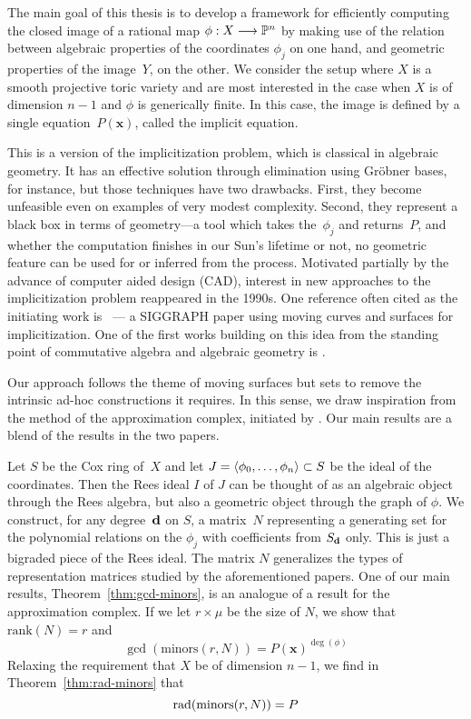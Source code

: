 \documentclass[fleqn,reqno]{amsart}
\begin{document}

The main goal of this thesis is to develop a framework for
efficiently computing the closed image of a rational map $\phi:X\longrightarrow\mathbb{P}^n$ by
making use of the relation between algebraic properties of the coordinates $\phi_j$ on one hand,
and geometric properties of the image~$Y$, on the other.
We consider the setup where $X$ is a smooth projective toric variety
and are most interested in the case when $X$ is of dimension $n-1$ and $\phi$ is generically finite.
In this case,
the image is defined by a single equation~$P(\mathbf x)$,
called the implicit equation.

This is a version of the implicitization problem, which is classical in algebraic geometry.
It has an effective solution through elimination using Gr\"obner bases, for instance,
but those techniques have two drawbacks.
First, they become unfeasible even on examples of very modest complexity.
Second, they represent a black box in terms of geometry---a tool which
takes the~$\phi_j$ and returns~$P$,
and whether the computation finishes in our Sun's lifetime or not,
no geometric feature can be used for or inferred from the process.
Motivated partially by the advance of computer aided design (CAD),
interest in new approaches to the implicitization problem
reappeared in the 1990s.
One reference often cited as the initiating work is \cite{SC-95}~---
a SIGGRAPH paper using moving curves and surfaces for implicitization.
One of the first works building on this idea from the standing point
of commutative algebra and algebraic geometry is \citet{CGZ-00}.

Our approach follows the theme of moving surfaces but sets to remove the intrinsic
ad-hoc constructions it requires.
In this sense,
we draw inspiration from the method of the approximation complex,
initiated by \citet{BJ-03}.
Our main results are a blend of the results in the two papers.

Let $S$ be the Cox ring of~$X$ and
let $J=\langle\phi_0,\ldots,\phi_n\rangle\subset S$ be the ideal of the coordinates.
Then the Rees ideal $I$ of $J$ can be thought of as
an algebraic object through the Rees algebra, but also
a geometric object through the graph of $\phi$.
We construct, for any degree~$\mathbf d$ on $S$,
a matrix~$N$ representing a generating set for the polynomial relations on the $\phi_j$
with coefficients from $S_\mathbf d$ only.
This is just a bigraded piece of the Rees ideal.
The matrix $N$ generalizes the types of representation matrices
studied by the aforementioned papers.
One of our main results, Theorem~\ref{thm:gcd-minors},
is an analogue of a result for the approximation complex.
If we let $r\times\mu$ be the size of $N$,
we show that $\text{rank}(N)=r$ and
\[
	\gcd(\text{minors}(r,N))=P(\mathbf x)^{\deg(\phi)}
\]
Relaxing the requirement that $X$ be of dimension $n-1$,
we find in Theorem~\ref{thm:rad-minors} that
\[
	\operatorname{rad}(\text{minors}(r,N))=P
\]
\end{document}
